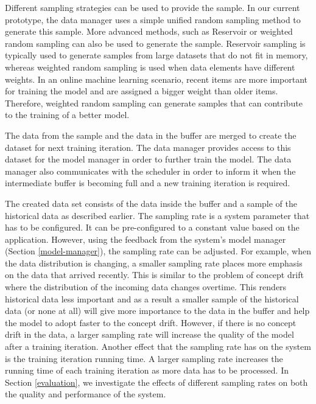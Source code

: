 Different sampling strategies can be used to provide the sample.
In our current prototype, the data manager uses a simple unified random sampling method to generate this sample.
More advanced methods, such as Reservoir \cite{vitter1985random} or weighted random sampling can also be used to generate the sample.
Reservoir sampling is typically used to generate samples from large datasets that do not fit in memory, whereas weighted random sampling is used when data elements have different weights.
In an online machine learning scenario, recent items are more important for training the model and are assigned a bigger weight than older items.
Therefore, weighted random sampling can generate samples that can contribute to the training of a better model.

The data from the sample and the data in the buffer are merged to create the dataset for next training iteration.
The data manager provides access to this dataset for the model manager in order to further train the model.
The data manager also communicates with the scheduler in order to inform it when the intermediate buffer is becoming full and a new training iteration is required. 

The created data set consists of the data inside the buffer and a sample of the historical data as described earlier.
The sampling rate is a system parameter that has to be configured.
It can be pre-configured to a constant value based on the application.
However, using the feedback from the system's model manager (Section \ref{model-manager}), the sampling rate can be adjusted.
For example, when the data distribution is changing, a smaller sampling rate places more emphasis on the data that arrived recently. 
This is similar to the problem of concept drift where the distribution of the incoming data changes overtime.
This renders historical data less important and as a result a smaller sample of the historical data (or none at all) will give more importance to the data in the buffer and help the model to adopt faster to the concept drift.
However, if there is no concept drift in the data, a larger sampling rate will increase the quality of the model after a training iteration.
Another effect that the sampling rate has on the system is the training iteration running time.
A larger sampling rate increases the running time of each training iteration as more data has to be processed.
In Section \ref{evaluation}, we investigate the effects of different sampling rates on both the quality and performance of the system.

